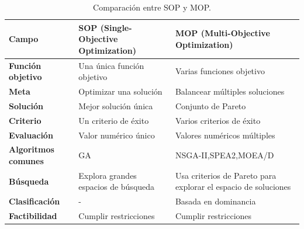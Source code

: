 \begin{table}[h!]
  \centering
  \renewcommand{\arraystretch}{1.5}
  \begin{tabularx}{\textwidth}{|l|X|X|}
  \hline
  \textbf{Campo} & \textbf{SOP (Single-Objective Optimization)} & \textbf{MOP (Multi-Objective Optimization)} \\
  \hline
  \textbf{Función objetivo} & Una única función objetivo & Varias funciones objetivo \\
  \hline
  \textbf{Meta} & Optimizar una solución & Balancear múltiples soluciones \\
  \hline
  \textbf{Solución} & Mejor solución única & Conjunto de Pareto \\
  \hline
  \textbf{Criterio} & Un criterio de éxito & Varios criterios de éxito \\
  \hline
  \textbf{Evaluación} & Valor numérico único & Valores numéricos múltiples \\
  \hline
  \textbf{Algoritmos comunes} & GA & NSGA-II,SPEA2,MOEA/D \\
  \hline
  \textbf{Búsqueda} & Explora grandes espacios de búsqueda & Usa criterios de Pareto para explorar el espacio de soluciones \\
  \hline
  \textbf{Clasificación} & - & Basada en dominancia \\
  \hline
  \textbf{Factibilidad} & Cumplir restricciones & Cumplir restricciones \\
  \hline
  \end{tabularx}
  \caption{Comparación entre SOP y MOP.}
  \label{table:sopvsmop}
\end{table}